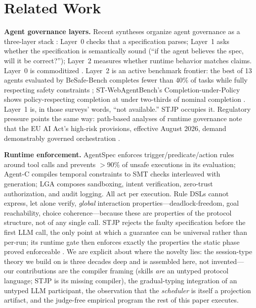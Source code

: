 \documentclass{article}
\newcommand{\stjp}{\textsc{STJP}}
\begin{document}
\section{Related Work}\label{sec:related}
\textbf{Agent governance layers.} Recent syntheses organize agent governance as a three-layer stack \citep{governspec,lga}: Layer~0 checks that a specification parses; Layer~1 asks whether the specification is semantically sound (``if the agent believes the spec, will it be correct?''); Layer~2 measures whether runtime behavior matches claims. Layer~0 is commoditized \citep{skilldex}. Layer~2 is an active benchmark frontier: the best of 13 agents evaluated by BeSafe-Bench completes fewer than 40\% of tasks while fully respecting safety constraints \citep{besafe}; ST-WebAgentBench's Completion-under-Policy shows policy-respecting completion at under two-thirds of nominal completion \citep{stweb}. Layer~1 is, in those surveys' words, ``not available.'' \stjp{} occupies it. Regulatory pressure points the same way: path-based analyses of runtime governance note that the EU AI Act's high-risk provisions, effective August 2026, demand demonstrably governed orchestration \citep{pathgov}.

\textbf{Runtime enforcement.} AgentSpec \citep{agentspec} enforces trigger/predicate/action rules around tool calls and prevents $>$90\% of unsafe executions in its evaluation; Agent-C \citep{agentc} compiles temporal constraints to SMT checks interleaved with generation; LGA \citep{lga} composes sandboxing, intent verification, zero-trust authorization, and audit logging. All act per execution. Rule DSLs cannot express, let alone verify, \emph{global} interaction properties---deadlock-freedom, goal reachability, choice coherence---because these are properties of the protocol structure, not of any single call. \stjp{} rejects the faulty specification before the first LLM call, the only point at which a guarantee can be universal rather than per-run; its runtime gate then enforces exactly the properties the static phase proved enforceable \citep{bocchi13}. We are explicit about where the novelty lies: the session-type theory we build on is three decades deep and is assembled here, not invented---our contributions are the compiler framing (skills \emph{are} an untyped protocol language; \stjp{} is its missing compiler), the gradual-typing integration of an untyped LLM participant, the observation that the \emph{scheduler} is itself a projection artifact, and the judge-free empirical program the rest of this paper executes.
\end{document}
